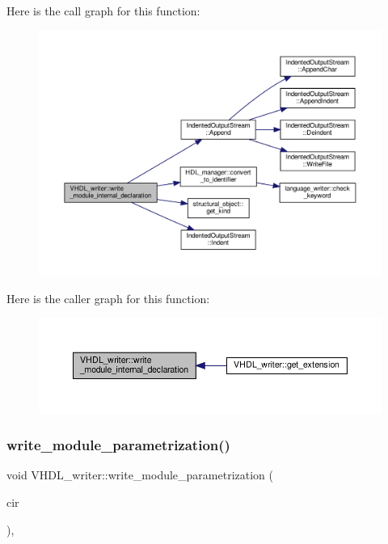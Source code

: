 Here is the call graph for this function\+:
\nopagebreak
\begin{figure}[H]
\begin{center}
\leavevmode
\includegraphics[width=350pt]{d0/d0c/structVHDL__writer_a30331328811ba735b896a60304e09074_cgraph}
\end{center}
\end{figure}
Here is the caller graph for this function\+:
\nopagebreak
\begin{figure}[H]
\begin{center}
\leavevmode
\includegraphics[width=350pt]{d0/d0c/structVHDL__writer_a30331328811ba735b896a60304e09074_icgraph}
\end{center}
\end{figure}
\mbox{\label{structVHDL__writer_ad9ae71cdd9eefe75ccaffac7aad2c909}} 
\subsubsection{\texorpdfstring{write\+\_\+module\+\_\+parametrization()}{write\_module\_parametrization()}}
{\footnotesize\ttfamily void V\+H\+D\+L\+\_\+writer\+::write\+\_\+module\+\_\+parametrization (\begin{DoxyParamCaption}\item[{const \hyperlink{structural__objects_8hpp_a8ea5f8cc50ab8f4c31e2751074ff60b2}{structural\+\_\+object\+Ref} \&}]{cir }\end{DoxyParamCaption})\hspace{0.3cm}{\ttfamily [override]}, {\ttfamily [virtual]}}




